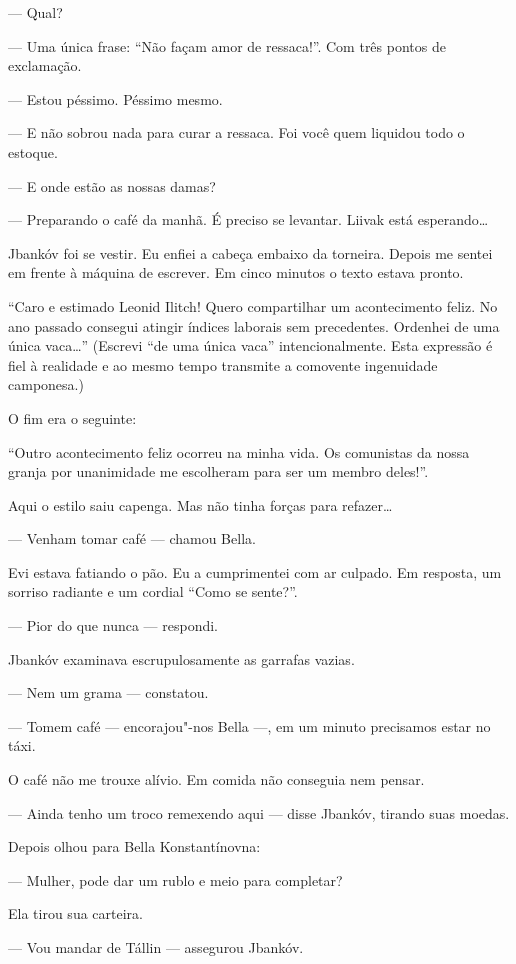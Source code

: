 --- Qual?

--- Uma única frase: ``Não façam amor de ressaca!''. Com três
pontos de exclamação.

--- Estou péssimo. Péssimo mesmo.

--- E não sobrou nada para curar a ressaca. Foi você quem
liquidou todo o estoque.

--- E onde estão as nossas damas?

--- Preparando o café da manhã. É preciso se levantar. Liivak
está esperando\ldots{}

Jbankóv foi se vestir. Eu enfiei a cabeça embaixo da torneira. Depois me
sentei em frente à máquina de escrever. Em cinco minutos o texto estava
pronto.

``Caro e estimado Leonid Ilitch! Quero compartilhar um acontecimento
feliz. No ano passado consegui atingir índices laborais sem precedentes.
Ordenhei de uma única vaca\ldots{}'' (Escrevi ``de uma única vaca''
intencionalmente. Esta expressão é fiel à realidade e ao mesmo tempo
transmite a comovente ingenuidade camponesa.)

O fim era o seguinte:

``Outro acontecimento feliz ocorreu na minha vida. Os comunistas da
nossa granja por unanimidade me escolheram para ser um membro deles!''.

Aqui o estilo saiu capenga. Mas não tinha forças para refazer\ldots{}

--- Venham tomar café --- chamou Bella.

Evi estava fatiando o pão. Eu a cumprimentei com ar culpado. Em
resposta, um sorriso radiante e um cordial ``Como se sente?''.

--- Pior do que nunca --- respondi.

Jbankóv examinava escrupulosamente as garrafas vazias.

--- Nem um grama --- constatou.

--- Tomem café --- encorajou"-nos Bella ---, em um
minuto precisamos estar no táxi.

O café não me trouxe alívio. Em comida não conseguia nem pensar.

--- Ainda tenho um troco remexendo aqui --- disse Jbankóv,
tirando suas moedas.

Depois olhou para Bella Konstantínovna:

--- Mulher, pode dar um rublo e meio para completar?

Ela tirou sua carteira.

--- Vou mandar de Tállin --- assegurou Jbankóv.

